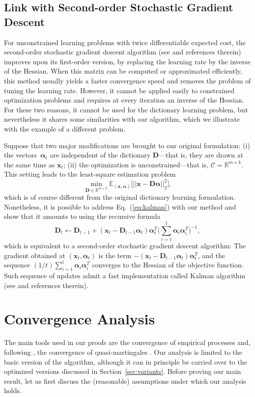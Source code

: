 \documentclass[twoside,11pt]{article}
\def\x{{\mathbf x}}
\def\alphab{{\boldsymbol\alpha}}
\def\D{{\mathbf D}}
\def\E{{\mathbb E}}
\def\C{{\mathcal C}}
\def\Real{{\mathbb R}}
\begin{document}
\subsection{Link with Second-order Stochastic Gradient Descent} \label{subsec:link}
For unconstrained learning problems with twice differentiable expected cost, 
the second-order stochastic gradient descent algorithm (see
\citealp{bottou} and references therein) improves upon its first-order version,
by replacing the learning rate by the inverse of the Hessian. When this matrix 
can be computed or approximated efficiently, this method usually yields a faster
convergence speed and removes the problem of tuning the learning
rate. However, it cannot be applied easily to constrained optimization problems
and requires at every iteration an inverse of the Hessian.
For these two reasons, it cannot be used for the dictionary learning problem,
but nevertheless it shares some similarities with our algorithm, which we
illustrate with the example of a different problem.

Suppose that two major modifications are brought to our original formulation: (i) the
vectors~$\alphab_t$ are independent of the dictionary $\D$---that is, they are
drawn at the same time as $\x_t$;  (ii) the optimization is unconstrained---that is, $\C =
\Real^{m \times k}$.  This setting leads to the least-square estimation
problem
\begin{equation}
   \min_{\D \in \Real^{m \times k}} \E_{(\x,\alphab)}\big[||\x-\D\alphab||_2^2\big],\label{eq:kalman}
\end{equation}
which is of course different from the original dictionary learning formulation.
Nonetheless, it is possible to address Eq.~(\ref{eq:kalman}) with our method and show that
it amounts to using the recursive formula 
\begin{displaymath}
   \D_t \leftarrow \D_{t-1} + (\x_t-\D_{t-1}\alphab_t)\alphab_t^T \Big(
   \sum_{i=1}^{t} \alphab_i \alphab_i^T \Big)^{-1},
\end{displaymath}
which is equivalent to a second-order stochastic gradient descent
algorithm: The gradient obtained at
$(\x_t,\alphab_t)$ is the term \mbox{$-(\x_t-\D_{t-1}\alphab_t)\alphab_t^T$}, and the sequence \mbox{$(1/t)\sum_{i=1}^{t}\alphab_i\alphab_i^T$} converges to the Hessian of the objective function.
Such sequence of updates admit a fast implementation called Kalman
algorithm (see \citealp{kushner} and references therein).
\section{Convergence Analysis} \label{sec:conv}
The main tools used in our proofs are
the convergence of empirical processes \citep{vaart} and,
following \citet{bottou2}, the convergence of quasi-martingales \citep{fisk}.
Our analysis is limited to the basic version of the algorithm, although it
can in principle be carried over to the optimized versions discussed in
Section~\ref{sec:variants}. 
Before proving our main result,
let us first discuss the (reasonable) assumptions under
which our analysis holds.
\end{document}
